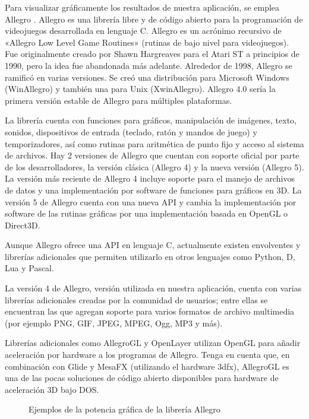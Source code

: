 Para visualizar gráficamente los resultados de nuestra aplicación, se emplea
Allegro \cite{Hargreaves:2010:ALL}. Allegro es una librería libre y de código
abierto para la programación de videojuegos desarrollada en lenguaje C. Allegro
es un acrónimo recursivo de «Allegro Low Level Game Routines» (rutinas de bajo
nivel para videojuegos). Fue originalmente creado por Shawn Hargreaves para el
Atari ST a principios de 1990, pero la idea fue abandonada más adelante.
Alrededor de 1998, Allegro se ramificó en varias versiones. Se creó una
distribución para Microsoft Windows (WinAllegro) y también una para Unix
(XwinAllegro). Allegro 4.0 sería la primera versión estable de Allegro para
múltiples plataformas.

La librería cuenta con funciones para gráficos, manipulación de imágenes, texto,
sonidos, dispositivos de entrada (teclado, ratón y mandos de juego) y
temporizadores, así como rutinas para aritmética de punto fijo y acceso al
sistema de archivos. Hay 2 versiones de Allegro que cuentan con soporte oficial
por parte de los desarrolladores, la versión clásica (Allegro 4) y la nueva
versión (Allegro 5). La versión más reciente de Allegro 4 incluye soporte para
el manejo de archivos de datos y una implementación por software de funciones
para gráficos en 3D. La versión 5 de Allegro cuenta con una nueva API y cambia
la implementación por software de las rutinas gráficas por una implementación
basada en OpenGL o Direct3D.

Aunque Allegro ofrece una API en lenguaje C, actualmente existen envolventes y 
librerías adicionales que permiten utilizarlo en otros lenguajes como Python, D, 
Lua y Pascal.

La versión 4 de Allegro, versión utilizada en nuestra aplicación,
cuenta con varias librerías adicionales creadas por la comunidad de usuarios;
entre ellas se encuentran las que agregan soporte para varios formatos de
archivo multimedia (por ejemplo PNG, GIF, JPEG, MPEG, Ogg, MP3 y más).

Librerías adicionales como AllegroGL y OpenLayer utilizan OpenGL para añadir 
aceleración por hardware a los programas de Allegro. Tenga en cuenta que, en 
combinación con Glide y MesaFX (utilizando el hardware 3dfx), AllegroGL es una
de las pocas soluciones de código abierto disponibles para hardware de 
aceleración 3D bajo DOS.

\begin{figure}[!htb]
\centering
{}
\caption{Ejemplos de la potencia gráfica de la librería Allegro}
\end{figure}

